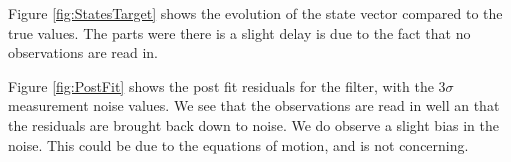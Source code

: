 \documentclass[]{BasiliskReportMemo}
\begin{document}
Figure \ref{fig:StatesTarget} shows the evolution of the state vector compared to the true values. The parts were there is a slight delay is due to the fact that no observations are read in. 

Figure \ref{fig:PostFit} shows the post fit residuals for the filter, with the $3\sigma$ measurement noise values. We see that the observations are read in well an that the residuals are brought back down to noise. We do observe a slight bias in the noise. This could be due to the equations of motion, and is not concerning.





\end{document}
